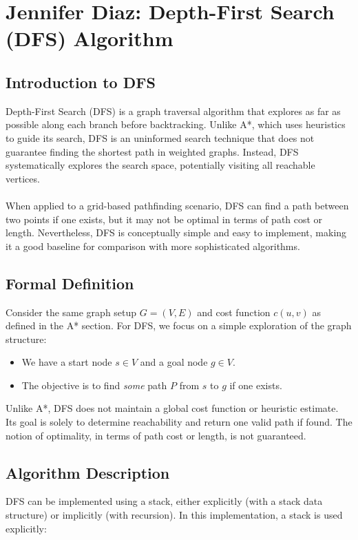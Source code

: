 \documentclass[12pt]{article}
\begin{document}
\section{Jennifer Diaz: Depth-First Search (DFS) Algorithm}
\subsection{Introduction to DFS}
Depth-First Search (DFS) is a graph traversal algorithm that explores as far as possible along each branch before backtracking. Unlike A*, which uses heuristics to guide its search, DFS is an uninformed search technique that does not guarantee finding the shortest path in weighted graphs. Instead, DFS systematically explores the search space, potentially visiting all reachable vertices.
\\
\\
When applied to a grid-based pathfinding scenario, DFS can find a path between two points if one exists, but it may not be optimal in terms of path cost or length. Nevertheless, DFS is conceptually simple and easy to implement, making it a good baseline for comparison with more sophisticated algorithms.

\subsection{Formal Definition}
Consider the same graph setup \( G = (V, E) \) and cost function \( c(u,v) \) as defined in the A* section. For DFS, we focus on a simple exploration of the graph structure:

\begin{itemize}
    \item We have a start node \( s \in V \) and a goal node \( g \in V \).
    \item The objective is to find \textit{some} path \( P \) from \( s \) to \( g \) if one exists.
\end{itemize}

\noindent Unlike A*, DFS does not maintain a global cost function or heuristic estimate. Its goal is solely to determine reachability and return one valid path if found. The notion of optimality, in terms of path cost or length, is not guaranteed.

\subsection{Algorithm Description}
DFS can be implemented using a stack, either explicitly (with a stack data structure) or implicitly (with recursion). In this implementation, a stack is used explicitly:
\end{document}
